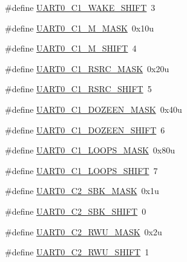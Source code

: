 \begin{DoxyCompactItemize}
\#define \hyperlink{group___u_a_r_t0___register___masks_gab94505f50416420f95a9b016940fb956}{U\+A\+R\+T0\+\_\+\+C1\+\_\+\+W\+A\+K\+E\+\_\+\+S\+H\+I\+FT}~3
\item 
\#define \hyperlink{group___u_a_r_t0___register___masks_gabdd6ccef43f8d2a143ed2cbd16b94cf1}{U\+A\+R\+T0\+\_\+\+C1\+\_\+\+M\+\_\+\+M\+A\+SK}~0x10u
\item 
\#define \hyperlink{group___u_a_r_t0___register___masks_ga8d31680c97fb0821a0613ea8edc4982e}{U\+A\+R\+T0\+\_\+\+C1\+\_\+\+M\+\_\+\+S\+H\+I\+FT}~4
\item 
\#define \hyperlink{group___u_a_r_t0___register___masks_ga746b65fa3c8e5bb60aa81f98984ea2a3}{U\+A\+R\+T0\+\_\+\+C1\+\_\+\+R\+S\+R\+C\+\_\+\+M\+A\+SK}~0x20u
\item 
\#define \hyperlink{group___u_a_r_t0___register___masks_ga6c6190c9625b3cae766cb5e83ec51ee9}{U\+A\+R\+T0\+\_\+\+C1\+\_\+\+R\+S\+R\+C\+\_\+\+S\+H\+I\+FT}~5
\item 
\#define \hyperlink{group___u_a_r_t0___register___masks_ga96d43575fd3133661535f83017c89298}{U\+A\+R\+T0\+\_\+\+C1\+\_\+\+D\+O\+Z\+E\+E\+N\+\_\+\+M\+A\+SK}~0x40u
\item 
\#define \hyperlink{group___u_a_r_t0___register___masks_ga5d6e4f4ab4b49ca54f600ff72198acbb}{U\+A\+R\+T0\+\_\+\+C1\+\_\+\+D\+O\+Z\+E\+E\+N\+\_\+\+S\+H\+I\+FT}~6
\item 
\#define \hyperlink{group___u_a_r_t0___register___masks_ga652e29ee005896dc658da4a9f4b45648}{U\+A\+R\+T0\+\_\+\+C1\+\_\+\+L\+O\+O\+P\+S\+\_\+\+M\+A\+SK}~0x80u
\item 
\#define \hyperlink{group___u_a_r_t0___register___masks_ga314b9a28f9ddde7c21b9c62b8bbab5a4}{U\+A\+R\+T0\+\_\+\+C1\+\_\+\+L\+O\+O\+P\+S\+\_\+\+S\+H\+I\+FT}~7
\item 
\#define \hyperlink{group___u_a_r_t0___register___masks_ga13e4f48ae7752289f4d05530569f86a2}{U\+A\+R\+T0\+\_\+\+C2\+\_\+\+S\+B\+K\+\_\+\+M\+A\+SK}~0x1u
\item 
\#define \hyperlink{group___u_a_r_t0___register___masks_gaa10ba8ef529e39693f0e8101fdec07fc}{U\+A\+R\+T0\+\_\+\+C2\+\_\+\+S\+B\+K\+\_\+\+S\+H\+I\+FT}~0
\item 
\#define \hyperlink{group___u_a_r_t0___register___masks_gae7b3477741c9fb0783930456da17ac03}{U\+A\+R\+T0\+\_\+\+C2\+\_\+\+R\+W\+U\+\_\+\+M\+A\+SK}~0x2u
\item 
\#define \hyperlink{group___u_a_r_t0___register___masks_ga2b35477c4d08786d549ff1908f1571e7}{U\+A\+R\+T0\+\_\+\+C2\+\_\+\+R\+W\+U\+\_\+\+S\+H\+I\+FT}~1
\item 

\end{DoxyCompactItemize}
